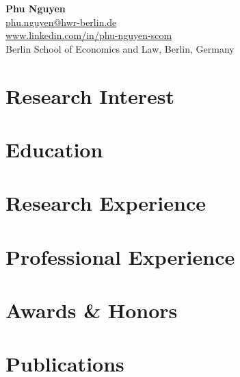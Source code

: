 \documentclass[11pt]{article} %
\newcommand{\mytitle}[4]{
  \begin{center}
    \Large\textbf{#1}\normalsize \\ %
    \href{mailto:#2}{#2} \\ %
    \href{https://#3}{#3} \\ %
    #4 %
  \end{center}
}
\begin{document}
\mytitle{Phu Nguyen}{phu.nguyen@hwr-berlin.de}{www.linkedin.com/in/phu-nguyen-scom}{Berlin School of Economics and Law, Berlin, Germany} %


\RaggedRight


\section*{Research Interest}
\label{res_interest}



\section*{Education}


\section*{Research Experience}
\label{exp_research}

\vspace{-.75em}

\section*{Professional Experience}
\label{exp_professional}


\section*{Awards \& Honors}
\label{awards}


\section*{Publications}
\label{pubs}
\end{document}
